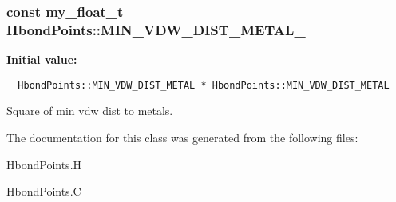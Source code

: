 \subsubsection{\setlength{\rightskip}{0pt plus 5cm}const my\_\-float\_\-t \bf{Hbond\-Points::MIN\_\-VDW\_\-DIST\_\-METAL\_}\hspace{0.3cm}{\tt  [static, private]}}\label{classASCbase_1_1HbondPoints_9fbe94d92727f2f547b3cc0bf6b5543a}


\textbf{Initial value:}

\begin{Code}\begin{verbatim} 
  HbondPoints::MIN_VDW_DIST_METAL * HbondPoints::MIN_VDW_DIST_METAL
\end{verbatim}\end{Code}
Square of min vdw dist to metals. 



The documentation for this class was generated from the following files:\begin{CompactItemize}
\item 
Hbond\-Points.H\item 
Hbond\-Points.C\end{CompactItemize}
